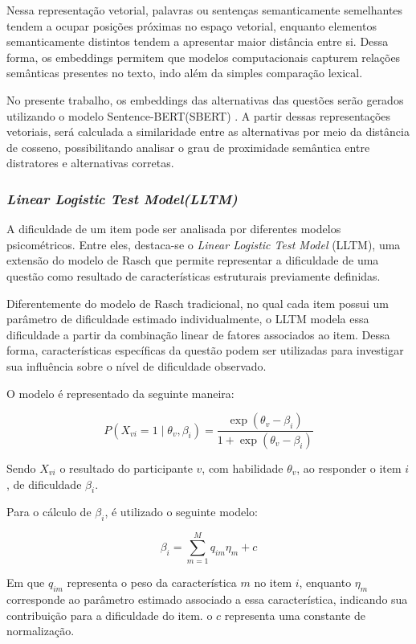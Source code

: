 \documentclass[a4paper,10pt, twocolumn]{article}
\begin{document}
Nessa representação vetorial, palavras ou sentenças semanticamente semelhantes tendem a ocupar posições próximas no espaço vetorial, enquanto elementos semanticamente distintos tendem a apresentar maior distância entre si. Dessa forma, os embeddings permitem que modelos computacionais capturem relações semânticas presentes no texto, indo além da simples comparação lexical. \cite{jm3}

No presente trabalho, os embeddings das alternativas das questões serão gerados utilizando o modelo Sentence-BERT(SBERT) \cite{reimers_sentence-bert_2019}. A partir dessas representações vetoriais, será calculada a similaridade entre as alternativas por meio da distância de cosseno, possibilitando analisar o grau de proximidade semântica entre distratores e alternativas corretas.

\subsubsection{\textit{Linear Logistic Test Model(LLTM)}}
A dificuldade de um item pode ser analisada por diferentes modelos psicométricos. Entre eles, destaca-se o \textit{Linear Logistic Test Model} (LLTM), uma extensão do modelo de Rasch que permite representar a dificuldade de uma questão como resultado de características estruturais previamente definidas. \cite{fischer_linear_1973}

Diferentemente do modelo de Rasch tradicional, no qual cada item possui um parâmetro de dificuldade estimado individualmente, o LLTM modela essa dificuldade a partir da combinação linear de fatores associados ao item. Dessa forma, características específicas da questão podem ser utilizadas para investigar sua influência sobre o nível de dificuldade observado.

O modelo é representado da seguinte maneira:

\[
P(X_{vi} = 1 \mid \theta_v, \beta_i) =
\frac{\exp(\theta_v - \beta_i)}
{1 + \exp(\theta_v - \beta_i)}
\]

Sendo $X_{vi}$ o resultado do participante $v$, com habilidade $\theta_v$, ao responder o item $i$, de dificuldade $\beta_i$.

Para o cálculo de $\beta_i$, é utilizado o seguinte modelo:

\[
\beta_i = \sum_{m=1}^{M} q_{im}\eta_m + c
\]

Em que $q_{im}$ representa o peso da característica $m$ no item $i$, enquanto $\eta_m$ corresponde ao parâmetro estimado associado a essa característica, indicando sua contribuição para a dificuldade do item. o $c$ representa uma constante de normalização. 
\end{document}
